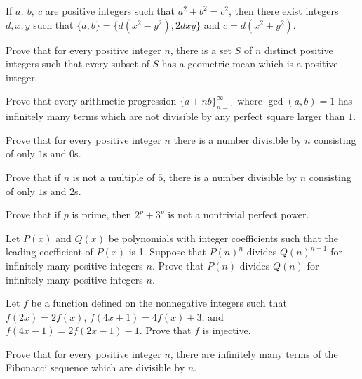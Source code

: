 \begin{result}{\label{r:n:n:pr:4}}
    If $a,\ b,\ c$ are positive integers such that $a^2+b^2=c^2$, then there
    exist integers $d,x,y$ such that $\{a,b\}=\{d(x^2-y^2),2dxy\}$ and
    $c=d(x^2+y^2)$.
\end{result}
\begin{problem}{\label{p:n:n:pr:56}}
  Prove that for every positive integer $n$, there is a set $S$ of $n$
    distinct positive integers such that every subset of $S$ has a geometric
    mean which is a positive integer.
\end{problem}
\begin{problem}{\label{p:n:n:pr:57}}
    Prove that every arithmetic progression $\{a+nb\}_{n=1}^\infty$ where
    $\gcd(a,b)=1$ has infinitely many terms which are not divisible by any
    perfect square larger than $1$.
\end{problem}
\begin{problem}{\label{p:n:n:pr:58}}
    Prove that for every positive integer $n$ there is a number divisible by
    $n$ consisting of only $1$s and $0$s.
\end{problem}
\begin{problem}{\label{p:n:n:pr:58b}}
    Prove that if $n$ is not a multiple of $5$, there is a number
    divisible by $n$ consisting of only $1$s and $2$s.
\end{problem}
\begin{problem}{\label{p:n:n:pr:59}}
  Prove that if $p$ is prime, then $2^p+3^p$ is not a nontrivial perfect
    power.
\end{problem}
\begin{problem}{\label{p:n:n:pr:60}}
  Let $P(x)$ and $Q(x)$ be polynomials with integer coefficients such that the
    leading coefficient of $P(x)$ is 1. Suppose that $P(n)^n$ divides $Q(n)^{n+1}$ for infinitely
    many positive integers $n$.
    Prove that $P(n)$ divides $Q(n)$ for infinitely many positive integers $n$.
\end{problem}
\begin{problem}{\label{p:n:n:pr:61}}
  Let $f$ be a function defined on the nonnegative integers such that
    $f(2x)=2f(x)$, $f(4x+1)=4f(x)+3$, and $f(4x-1)=2f(2x-1)-1$. Prove that $f$
    is injective.
\end{problem}
\begin{problem}{\label{p:n:n:pr:62}}
  Prove that for every positive integer $n$, there are infinitely many
    terms of the Fibonacci sequence which are divisible by $n$.
\end{problem}
